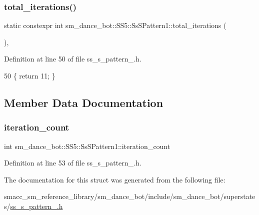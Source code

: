 \subsubsection{\texorpdfstring{total\+\_\+iterations()}{total\_iterations()}}
{\footnotesize\ttfamily static constexpr int sm\+\_\+dance\+\_\+bot\+::\+S\+S5\+::\+Ss\+S\+Pattern1\+::total\+\_\+iterations (\begin{DoxyParamCaption}{ }\end{DoxyParamCaption})\hspace{0.3cm}{\ttfamily [inline]}, {\ttfamily [static]}}



Definition at line 50 of file ss\+\_\+s\+\_\+pattern\+\_.\+h.


\begin{DoxyCode}
50 \{ \textcolor{keywordflow}{return} 11; \}
\end{DoxyCode}


\subsection{Member Data Documentation}
\mbox{\label{structsm__dance__bot_1_1SS5_1_1SsSPattern1_ac1b4a50a642face1106fd58d026067ac}} 
\subsubsection{\texorpdfstring{iteration\+\_\+count}{iteration\_count}}
{\footnotesize\ttfamily int sm\+\_\+dance\+\_\+bot\+::\+S\+S5\+::\+Ss\+S\+Pattern1\+::iteration\+\_\+count}



Definition at line 53 of file ss\+\_\+s\+\_\+pattern\+\_.\+h.



The documentation for this struct was generated from the following file\+:\begin{DoxyCompactItemize}
\item 
smacc\+\_\+sm\+\_\+reference\+\_\+library/sm\+\_\+dance\+\_\+bot/include/sm\+\_\+dance\+\_\+bot/superstates/\hyperlink{include_2sm__dance__bot_2superstates_2ss__s__pattern__1_8h}{ss\+\_\+s\+\_\+pattern\+\_.\+h}\end{DoxyCompactItemize}

